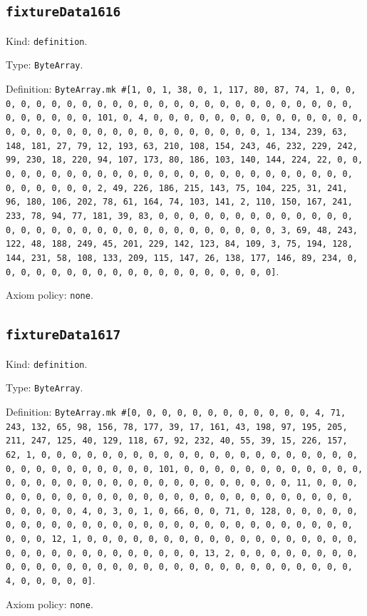 \documentclass[11pt]{article}
\begin{document}
\subsection*{\texttt{fixtureData1616}}
\noindent Kind: \texttt{definition}.\par
\noindent Type: \texttt{ByteArray}.\par
\noindent Definition: \texttt{ByteArray.mk \#[1, 0, 1, 38, 0, 1, 117, 80, 87, 74, 1, 0, 0, 0, 0, 0, 0, 0, 0, 0, 0, 0, 0, 0, 0, 0, 0, 0, 0, 0, 0, 0, 0, 0, 0, 0, 0, 0, 0, 0, 0, 0, 101, 0, 4, 0, 0, 0, 0, 0, 0, 0, 0, 0, 0, 0, 0, 0, 0, 0, 0, 0, 0, 0, 0, 0, 0, 0, 0, 0, 0, 0, 0, 0, 0, 0, 1, 134, 239, 63, 148, 181, 27, 79, 12, 193, 63, 210, 108, 154, 243, 46, 232, 229, 242, 99, 230, 18, 220, 94, 107, 173, 80, 186, 103, 140, 144, 224, 22, 0, 0, 0, 0, 0, 0, 0, 0, 0, 0, 0, 0, 0, 0, 0, 0, 0, 0, 0, 0, 0, 0, 0, 0, 0, 0, 0, 0, 0, 0, 0, 2, 49, 226, 186, 215, 143, 75, 104, 225, 31, 241, 96, 180, 106, 202, 78, 61, 164, 74, 103, 141, 2, 110, 150, 167, 241, 233, 78, 94, 77, 181, 39, 83, 0, 0, 0, 0, 0, 0, 0, 0, 0, 0, 0, 0, 0, 0, 0, 0, 0, 0, 0, 0, 0, 0, 0, 0, 0, 0, 0, 0, 0, 0, 0, 3, 69, 48, 243, 122, 48, 188, 249, 45, 201, 229, 142, 123, 84, 109, 3, 75, 194, 128, 144, 231, 58, 108, 133, 209, 115, 147, 26, 138, 177, 146, 89, 234, 0, 0, 0, 0, 0, 0, 0, 0, 0, 0, 0, 0, 0, 0, 0, 0, 0, 0, 0]}.\par
\noindent Axiom policy: \texttt{none}.\par
\subsection*{\texttt{fixtureData1617}}
\noindent Kind: \texttt{definition}.\par
\noindent Type: \texttt{ByteArray}.\par
\noindent Definition: \texttt{ByteArray.mk \#[0, 0, 0, 0, 0, 0, 0, 0, 0, 0, 0, 0, 4, 71, 243, 132, 65, 98, 156, 78, 177, 39, 17, 161, 43, 198, 97, 195, 205, 211, 247, 125, 40, 129, 118, 67, 92, 232, 40, 55, 39, 15, 226, 157, 62, 1, 0, 0, 0, 0, 0, 0, 0, 0, 0, 0, 0, 0, 0, 0, 0, 0, 0, 0, 0, 0, 0, 0, 0, 0, 0, 0, 0, 0, 0, 0, 0, 101, 0, 0, 0, 0, 0, 0, 0, 0, 0, 0, 0, 0, 0, 0, 0, 0, 0, 0, 0, 0, 0, 0, 0, 0, 0, 0, 0, 0, 0, 0, 0, 11, 0, 0, 0, 0, 0, 0, 0, 0, 0, 0, 0, 0, 0, 0, 0, 0, 0, 0, 0, 0, 0, 0, 0, 0, 0, 0, 0, 0, 0, 0, 0, 4, 0, 3, 0, 1, 0, 66, 0, 0, 71, 0, 128, 0, 0, 0, 0, 0, 0, 0, 0, 0, 0, 0, 0, 0, 0, 0, 0, 0, 0, 0, 0, 0, 0, 0, 0, 0, 0, 0, 0, 0, 0, 0, 12, 1, 0, 0, 0, 0, 0, 0, 0, 0, 0, 0, 0, 0, 0, 0, 0, 0, 0, 0, 0, 0, 0, 0, 0, 0, 0, 0, 0, 0, 0, 0, 0, 13, 2, 0, 0, 0, 0, 0, 0, 0, 0, 0, 0, 0, 0, 0, 0, 0, 0, 0, 0, 0, 0, 0, 0, 0, 0, 0, 0, 0, 0, 0, 0, 0, 4, 0, 0, 0, 0, 0]}.\par
\noindent Axiom policy: \texttt{none}.\par
\end{document}
